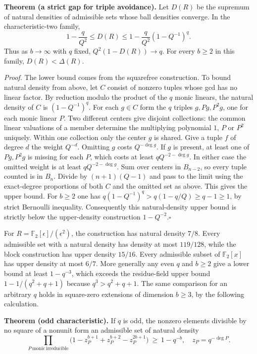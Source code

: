 \medskip\noindent\textbf{Theorem (a strict gap for triple avoidance).}
Let $D(R)$ be the supremum of natural densities of admissible sets
whose ball densities converge. In the characteristic-two family,
\[
 1-\frac q{Q^2}\le D(R)
 \le 1-\frac q{Q^2}(1-Q^{-1})^q.
\]
Thus as $b\to\infty$ with $q$ fixed, $Q^2(1-D(R))\to q$.
For every $b\ge2$ in this family, $D(R)<\Delta(R)$.

\smallskip\noindent\emph{Proof.}
The lower bound comes from the squarefree construction. To bound natural
density from above, let $C$ consist of nonzero tuples whose gcd has no
linear factor. By reduction modulo the product of the $q$ monic linears,
the natural density of $C$ is $(1-Q^{-1})^q$. For each $g\in C$ form
the $q$ triples $g,Pg,P^2g$, one for each monic linear $P$. Two different
centers give disjoint collections: the common linear valuations of a
member determine the multiplying polynomial $1$, $P$ or $P^2$ uniquely.
Within one collection only the center $g$ is shared. Give a tuple $f$
of degree $d$ the weight $Q^{-d}$. Omitting $g$ costs $Q^{-\deg g}$.
If $g$ is present, at least one of $Pg,P^2g$ is missing for each $P$,
which costs at least $qQ^{-2-\deg g}$. In either case the omitted
weight is at least $qQ^{-2-\deg g}$. Sum over centers in $B_{n-2}$,
so every tuple counted is in $B_n$. Divide by $(n+1)(Q-1)$ and pass to
the limit using the exact-degree proportions of both $C$ and the
omitted set as above. This gives the upper bound. For $b\ge2$ one has
$q(1-Q^{-1})^q>q(1-q/Q)\ge q-1\ge1$, by strict Bernoulli inequality.
Consequently this natural-density upper bound is strictly below the
upper-density construction $1-Q^{-2}$.\hfill$\square$

For $R=\mathbb F_2[\epsilon]/(\epsilon^2)$, the construction has
natural density $7/8$. Every admissible set with a natural density has
density at most $119/128$, while the block construction has upper density
$15/16$. Every admissible subset of $\mathbb F_2[x]$ has
upper density at most $6/7$. More generally any even $q$ and $b\ge2$
give a lower bound at least $1-q^{-3}$, which exceeds the residue-field
upper bound $1-1/(q^2+q+1)$ because $q^3>q^2+q+1$.
The same comparison for an arbitrary $q$ holds in square-zero
extensions of dimension $b\ge3$, by the following calculation.

\medskip\noindent\textbf{Theorem (odd characteristic).}
If $q$ is odd, the nonzero elements divisible by no square of a nonunit
form an admissible set of natural density
\begin{equation}
 \prod_{P\ \mathrm{monic\ irreducible}}
 \bigl(1-z_P^{b+1}+z_P^{b+2}-z_P^{2b+1}\bigr)
 \ \ge\ 1-q^{-b},
 \quad z_P=q^{-\deg P}.
 \label{eq:local-ring-odd}
\end{equation}

